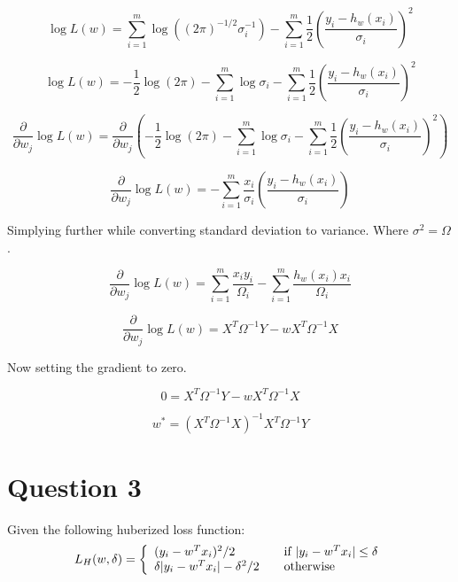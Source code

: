 \documentclass{report}
\begin{document}
  \begin{equation}
     \log L(w) = \sum_{i=1}^{m} \log \left((2\pi)^{-1/2}\sigma_i^{-1}\right)
     - \sum_{i=1}^{m} \frac{1}{2}\left(\frac{y_i-h_w(x_i)}{\sigma_i}\right)^2
  \end{equation}

  \begin{equation}
     \log L(w) = -\frac{1}{2} \log(2\pi)
     - \sum_{i=1}^{m} \log \sigma_i
     - \sum_{i=1}^{m} \frac{1}{2}\left(\frac{y_i-h_w(x_i)}{\sigma_i}\right)^2
  \end{equation}

\begin{equation}
     \frac{\partial}{\partial w_j} \log L(w)
     = \frac{\partial}{\partial w_j} \left(-\frac{1}{2} \log(2\pi)
     - \sum_{i=1}^{m} \log \sigma_i
     - \sum_{i=1}^{m} \frac{1}{2}\left(\frac{y_i-h_w(x_i)}{\sigma_i}\right)^2\right)
\end{equation}

\begin{equation}
     \frac{\partial}{\partial w_j} \log L(w) =
     - \sum_{i=1}^{m} \frac{x_i}{\sigma_i}\left(\frac{y_i-h_w(x_i)}{\sigma_i}\right)
\end{equation}

Simplying further while converting standard deviation to variance. Where $\sigma^2 = \Omega$.

\begin{equation}
     \frac{\partial}{\partial w_j} \log L(w) =
     \sum_{i=1}^{m} \frac{x_iy_i}{\Omega_i}
     - \sum_{i=1}^{m}\frac{h_w(x_i)x_i}{\Omega_i}
\end{equation}

\begin{equation}
     \frac{\partial}{\partial w_j} \log L(w) =
     X^T\Omega^{-1}Y - wX^T\Omega^{-1}X
\end{equation}

Now setting the gradient to zero.

\begin{equation}
     0 =X^T\Omega^{-1}Y
     - wX^T\Omega^{-1}X
\end{equation}

\begin{equation}
     w^* = (X^T\Omega^{-1} X)^{-1} X^T\Omega^{-1} Y
\end{equation}


\section*{Question 3}
Given the following huberized loss function:
\begin{equation}
  L_H(w, \delta) = \left\{
  \begin{array}{l l}
    (y_i - w^Tx_i)^2 / 2 & \quad \text{if }  | y_i - w^Tx_i | \leq \delta\\
    \delta | y_i - w^Tx_i | - \delta^2 / 2 & \quad \text{otherwise}

  \end{array} \right.\end{equation}
\end{document}
